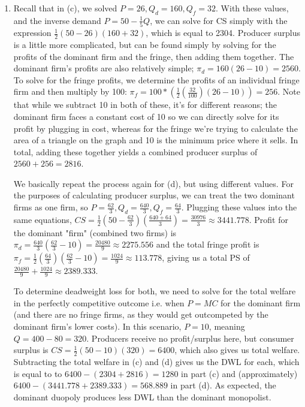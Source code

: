 \documentclass[12pt,letterpaper]{article}
\begin{document}
\begin{enumerate}
\begin{enumerate}
	\item Recall that in (c), we solved $P = 26, Q_d = 160, Q_f = 32$. With these values, and the inverse demand $P = 50 - \frac{1}{5}Q$, we can solve for CS simply with the expression $\frac{1}{2}(50 - 26) (160 + 32)$, which is equal to 2304. Producer surplus is a little more complicated, but can be found simply by solving for the profits of the dominant firm and the fringe, then adding them together. The dominant firm's profits are also relatively simple; $\pi_d = 160 (26 - 10) = 2560$. To solve for the fringe profits, we determine the profits of an individual fringe firm and then multiply by 100: $\pi_f = 100 * (\frac{1}{2} (\frac{32}{100})(26-10)) = 256$. Note that while we subtract 10 in both of these, it's for different reasons; the dominant firm faces a constant cost of 10 so we can directly solve for its profit by plugging in cost, whereas for the fringe we're trying to calculate the area of a triangle on the graph and 10 is the minimum price where it sells. In total, adding these together yields a combined producer surplus of $2560 + 256 = 2816$.
	
	We basically repeat the process again for (d), but using different values. For the purposes of calculating producer surplus, we can treat the two dominant firms as one firm, so $P=\frac{62}{3}, Q_d = \frac{640}{3}, Q_f = \frac{64}{3}$. Plugging these values into the same equations, $CS = \frac{1}{2}(50-\frac{62}{3})(\frac{640 + 64}{3}) = \frac{30976}{3} \approx 3441.778$. Profit for the dominant "firm" (combined two firms) is $\pi_d = \frac{640}{3}(\frac{62}{3}-10) = \frac{20480}{9} \approx 2275.556$ and the total fringe profit is $\pi_f = \frac{1}{2} (\frac{64}{3})(\frac{62}{3}-10) = \frac{1024}{9} \approx 113.778$, giving us a total PS of $\frac{20480}{9}+\frac{1024}{9} \approx 2389.333$.

	To determine deadweight loss for both, we need to solve for the total welfare in the perfectly competitive outcome i.e. when $P=MC$ for the dominant firm (and there are no fringe firms, as they would get outcompeted by the dominant firm's lower costs). In this scenario, $P=10$, meaning $Q=400-80 = 320$. Producers receive no profit/surplus here, but consumer surplus is $CS = \frac{1}{2} (50-10)(320) = 6400$, which also gives us total welfare. Subtracting the total welfare in (c) and (d) gives us the DWL for each, which is equal to to $6400-(2304+2816)=1280$ in part (c) and (approximately) $6400 - (3441.778 + 2389.333) = 568.889$ in part (d). As expected, the dominant duopoly produces less DWL than the dominant monopolist.


\end{enumerate}
\end{enumerate}
\end{document}
